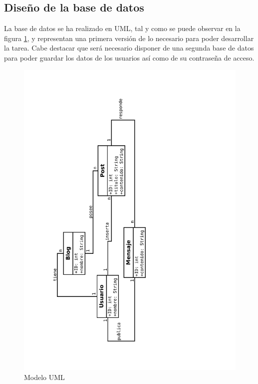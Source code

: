 \documentclass[a4paper]{report}
\begin{document}
	\subsection{Diseño de la base de datos}
	La base de datos se ha realizado en UML, tal y como se puede observar en la figura \ref{modeloER}, y representan una primera versión de lo necesario para poder desarrollar la tarea. Cabe destacar que será necesario disponer de una segunda base de datos para poder guardar los datos de los usuarios así como de su contraseña de acceso.
	\begin{figure}
		\includegraphics[keepaspectratio,width=\textwidth]{modeloER}
		\caption{Modelo UML}
		\label{modeloER}
	\end{figure}
	
\end{document}
